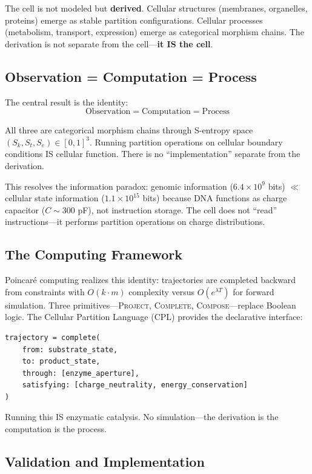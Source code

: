 \documentclass[11pt,a4paper]{article}
\theoremstyle{remark}
\newcommand{\Sk}{S_k}
\newcommand{\St}{S_t}
\newcommand{\Se}{S_e}
\begin{document}
The cell is not modeled but \textbf{derived}. Cellular structures (membranes, organelles, proteins) emerge as stable partition configurations. Cellular processes (metabolism, transport, expression) emerge as categorical morphism chains. The derivation is not separate from the cell---\textbf{it IS the cell}.

\subsection{Observation = Computation = Process}

The central result is the identity:
\begin{equation}
\text{Observation} = \text{Computation} = \text{Process}
\end{equation}

All three are categorical morphism chains through S-entropy space $(\Sk, \St, \Se) \in [0,1]^3$. Running partition operations on cellular boundary conditions IS cellular function. There is no ``implementation'' separate from the derivation.

This resolves the information paradox: genomic information ($6.4 \times 10^9$ bits) $\ll$ cellular state information ($1.1 \times 10^{15}$ bits) because DNA functions as charge capacitor ($C \sim 300$ pF), not instruction storage. The cell does not ``read'' instructions---it performs partition operations on charge distributions.

\subsection{The Computing Framework}

Poincar\'{e} computing realizes this identity: trajectories are completed backward from constraints with $O(k \cdot m)$ complexity versus $O(e^{\lambda T})$ for forward simulation. Three primitives---\textsc{Project}, \textsc{Complete}, \textsc{Compose}---replace Boolean logic. The Cellular Partition Language (CPL) provides the declarative interface:

\begin{verbatim}
trajectory = complete(
    from: substrate_state,
    to: product_state,
    through: [enzyme_aperture],
    satisfying: [charge_neutrality, energy_conservation]
)
\end{verbatim}

Running this IS enzymatic catalysis. No simulation---the derivation is the computation is the process.

\subsection{Validation and Implementation}
\end{document}
